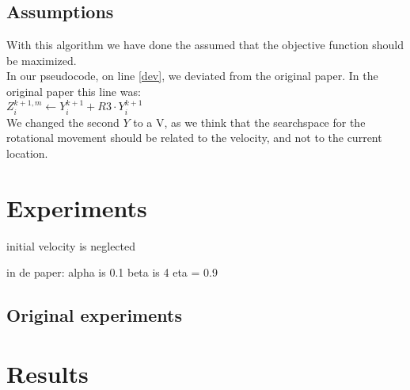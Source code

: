 \documentclass[runningheads]{llncs}
\begin{document}
\newpage
\subsection{Assumptions}
With this algorithm we have done the assumed that the objective function should be maximized.\\
In our pseudocode, on line \ref{dev}, we deviated from the original paper. In the original paper this line was: \\
$Z_i^{k+1, m} \leftarrow Y_i^{k+1} + R3 \cdot Y_i^{k+1}$ \\
We changed the second $ Y $ to a V, as we think that the searchspace for the rotational movement should be related to the velocity, and not to the current location.\\

\section{Experiments}


initial velocity is neglected

in de paper:
alpha is 0.1
beta is 4
eta = 0.9


\subsection{Original experiments}


\section{Results}
\end{document}
